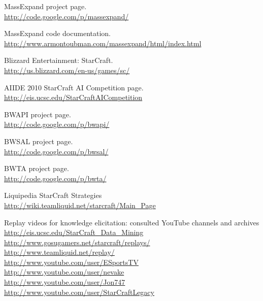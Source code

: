 
\nocite{*}

\begin{thebibliography}{99}

	MassExpand project page.\\
	\url{http://code.google.com/p/massexpand/}

	MassExpand code documentation.\\
	\url{http://www.armontoubman.com/massexpand/html/index.html}

	Blizzard Entertainment: StarCraft.\\
	\url{http://us.blizzard.com/en-us/games/sc/}

	AIIDE 2010 StarCraft AI Competition page.\\
	\url{http://eis.ucsc.edu/StarCraftAICompetition}

	BWAPI project page.\\
	\url{http://code.google.com/p/bwapi/}

	BWSAL project page.\\
	\url{http://code.google.com/p/bwsal/}

	BWTA project page.\\
	\url{http://code.google.com/p/bwta/}

	Liquipedia StarCraft Strategies \\
	\url{http://wiki.teamliquid.net/starcraft/Main_Page}

	Replay videos for knowledge elicitation: consulted YouTube channels and archives \\
	\url{http://eis.ucsc.edu/StarCraft_Data_Mining}\\
	\url{http://www.gosugamers.net/starcraft/replays/}\\
	\url{http://www.teamliquid.net/replay/}\\
	\url{http://www.youtube.com/user/ESportsTV}\\
	\url{http://www.youtube.com/user/nevake}\\
	\url{http://www.youtube.com/user/Jon747}\\
	\url{http://www.youtube.com/user/StarCraftLegacy}


\end{thebibliography}